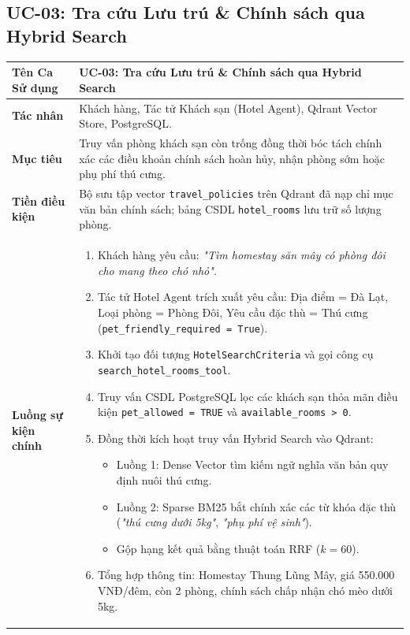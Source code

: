 \subsection{UC-03: Tra cứu Lưu trú \& Chính sách qua Hybrid Search}
\label{subsec:spec_uc03}

\begin{table}[h!]
\centering
\small
\begin{tabular}{|p{3.2cm}|p{11.5cm}|}
\hline
\textbf{Tên Ca Sử dụng} & \textbf{UC-03: Tra cứu Lưu trú \& Chính sách qua Hybrid Search} \\
\hline
\textbf{Tác nhân} & Khách hàng, Tác tử Khách sạn (Hotel Agent), Qdrant Vector Store, PostgreSQL. \\
\hline
\textbf{Mục tiêu} & Truy vấn phòng khách sạn còn trống đồng thời bóc tách chính xác các điều khoản chính sách hoàn hủy, nhận phòng sớm hoặc phụ phí thú cưng. \\
\hline
\textbf{Tiền điều kiện} & Bộ sưu tập vector \texttt{travel\_policies} trên Qdrant đã nạp chỉ mục văn bản chính sách; bảng CSDL \texttt{hotel\_rooms} lưu trữ số lượng phòng. \\
\hline
\textbf{Luồng sự kiện chính} & 
\begin{enumerate}
    \item Khách hàng yêu cầu: \textit{"Tìm homestay săn mây có phòng đôi cho mang theo chó nhỏ"}.
    \item Tác tử Hotel Agent trích xuất yêu cầu: Địa điểm = Đà Lạt, Loại phòng = Phòng Đôi, Yêu cầu đặc thù = Thú cưng (\texttt{pet\_friendly\_required = True}).
    \item Khởi tạo đối tượng \texttt{HotelSearchCriteria} và gọi công cụ \texttt{search\_hotel\_rooms\_tool}.
    \item Truy vấn CSDL PostgreSQL lọc các khách sạn thỏa mãn điều kiện \texttt{pet\_allowed = TRUE} và \texttt{available\_rooms > 0}.
    \item Đồng thời kích hoạt truy vấn Hybrid Search vào Qdrant:
    \begin{itemize}
        \item Luồng 1: Dense Vector tìm kiếm ngữ nghĩa văn bản quy định nuôi thú cưng.
        \item Luồng 2: Sparse BM25 bắt chính xác các từ khóa đặc thù (\textit{"thú cưng dưới 5kg"}, \textit{"phụ phí vệ sinh"}).
        \item Gộp hạng kết quả bằng thuật toán RRF ($k=60$).
    \end{itemize}
    \item Tổng hợp thông tin: Homestay Thung Lũng Mây, giá 550.000 VNĐ/đêm, còn 2 phòng, chính sách chấp nhận chó mèo dưới 5kg.

\end{enumerate}
\end{tabular}
\end{table}

